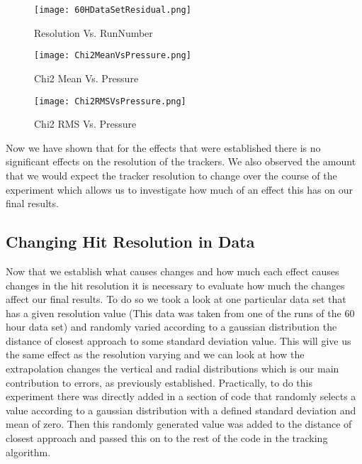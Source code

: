 \documentclass[./Thesis]{subfiles}
\begin{document}
\begin{figure}
	\centerline{\texttt{[image: 60HDataSetResidual.png]}}
	\caption[Resolution Vs Run Number]{Resolution Vs. RunNumber}
	\label{fig:ResRun}
\end{figure} 


	
\begin{figure}
	\centerline{\texttt{[image: Chi2MeanVsPressure.png]}}
	\caption[Chi2 Mean Vs. Pressure]{Chi2 Mean Vs. Pressure}
	\label{fig:chiMeanPres}
\end{figure}
	 
\begin{figure}
	\centerline{\texttt{[image: Chi2RMSVsPressure.png]}}
	\caption[Chi2 RMS Vs. Pressure]{Chi2 RMS Vs. Pressure}
	\label{fig:chiRMSPres}
\end{figure}
	

	 
	 Now we have shown that for the effects that were established there is no significant effects on the resolution of the trackers. We also observed the amount that we would expect the tracker resolution to change over the course of the experiment which allows us to investigate how much of an effect this has on our final results.
	
\subsection{Changing Hit Resolution in Data}

		Now that we establish what causes changes and how much each effect causes changes in the hit resolution it is necessary to evaluate how much the changes affect our final results. To do so we took a look at one particular data set that has a given resolution value (This data was taken from one of the runs of the 60 hour data set) and randomly varied according to a gaussian distribution the distance of closest approach to some standard deviation value. This will give us the same effect as the resolution varying and we can look at how the extrapolation changes the vertical and radial distributions which is our main contribution to errors, as previously established. Practically, to do this experiment there was directly added in a section of code that randomly selects a value according to a gaussian distribution with a defined standard deviation and mean of zero. Then this randomly generated value was added to the distance of closest approach and passed this on to the rest of the code in the tracking algorithm. 
		
\end{document}

